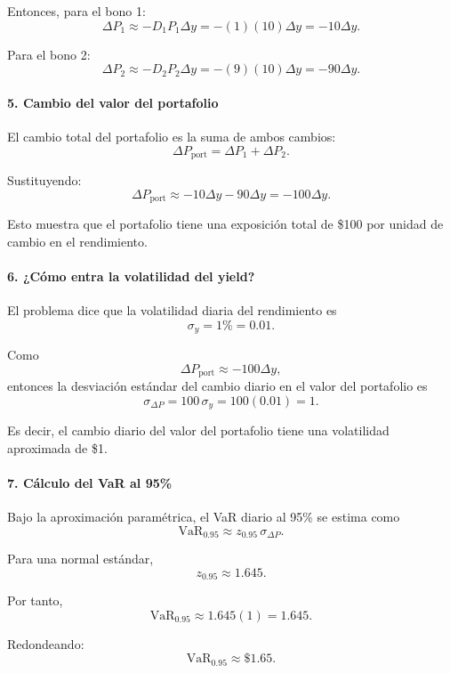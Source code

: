 Entonces, para el bono 1:
\[
\Delta P_1 \approx -D_1P_1\Delta y = -(1)(10)\Delta y = -10\Delta y.
\]

Para el bono 2:
\[
\Delta P_2 \approx -D_2P_2\Delta y = -(9)(10)\Delta y = -90\Delta y.
\]

\paragraph{5. Cambio del valor del portafolio}

El cambio total del portafolio es la suma de ambos cambios:
\[
\Delta P_{\text{port}}=\Delta P_1+\Delta P_2.
\]

Sustituyendo:
\[
\Delta P_{\text{port}}
\approx -10\Delta y-90\Delta y
= -100\Delta y.
\]

Esto muestra que el portafolio tiene una exposición total de \$100 por unidad de cambio en el rendimiento.

\paragraph{6. ¿Cómo entra la volatilidad del yield?}

El problema dice que la volatilidad diaria del rendimiento es
\[
\sigma_y=1\%=0.01.
\]

Como
\[
\Delta P_{\text{port}}\approx -100\Delta y,
\]
entonces la desviación estándar del cambio diario en el valor del portafolio es
\[
\sigma_{\Delta P}
=100\,\sigma_y
=100(0.01)
=1.
\]

Es decir, el cambio diario del valor del portafolio tiene una volatilidad
aproximada de \$1.

\paragraph{7. Cálculo del VaR al 95\%}

Bajo la aproximación paramétrica, el VaR diario al 95\% se estima como
\[
\mathrm{VaR}_{0.95}\approx z_{0.95}\,\sigma_{\Delta P}.
\]

Para una normal estándar,
\[
z_{0.95}\approx 1.645.
\]

Por tanto,
\[
\mathrm{VaR}_{0.95}\approx 1.645(1)=1.645.
\]

Redondeando:
\[
{\mathrm{VaR}_{0.95}\approx \$1.65.}
\]